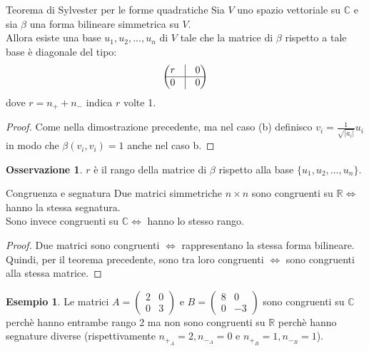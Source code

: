 \documentclass[a4paper]{article}
\theoremstyle{definition}
\newtheorem*{oss}{Osservazione}
\newtheorem*{es}{Esempio}
\begin{document}
	\begin{teo}{Teorema di Sylvester per le forme quadratiche}{}
		Sia $V$ uno spazio vettoriale su $\mathbb{C}$ e sia $\beta$ una forma bilineare simmetrica su $V$. \\
		Allora esiste una base $u_1, u_2, ..., u_n$ di $V$ tale che la matrice di $\beta$ rispetto a tale base è diagonale del tipo:
		\begin{align*}
			\begin{pmatrix}
				r & \vline & 0 \\
				\hline
				0 & \vline & 0
			\end{pmatrix}
		\end{align*}
		dove $r = n_+ + n_-$ indica $r$ volte 1.
	\end{teo}

	\begin{proof}
		Come nella dimostrazione precedente, ma nel caso (b) definisco $v_i = \frac{1}{\sqrt{|a_i|}}u_i$ in modo che $\beta(v_i, v_i) = 1$ anche nel caso b.
	\end{proof}

	\begin{oss}
		$r$ è il rango della matrice di $\beta$ rispetto alla base $\{u_1, u_2, ..., u_n\}$.
	\end{oss}

	\begin{cor}{Congruenza e segnatura}{}
		Due matrici simmetriche $n \times n$ sono congruenti su $\mathbb{R} \Leftrightarrow$ hanno la stessa segnatura. \\
		Sono invece congruenti su $\mathbb{C} \Leftrightarrow$ hanno lo stesso rango.
	\end{cor}

	\begin{proof}
		Due matrici sono congruenti $\Leftrightarrow$ rappresentano la stessa forma bilineare. \\
		Quindi, per il teorema precedente, sono tra loro congruenti $\Leftrightarrow$ sono congruenti alla stessa matrice.
	\end{proof}

	\begin{es}
		Le matrici $A = \begin{pmatrix}
			2 & 0 \\
			0 & 3
		\end{pmatrix}$ e $B = \begin{pmatrix}
			8 & 0 \\
			0 & -3
		\end{pmatrix}$ sono congruenti su $\mathbb{C}$ perchè hanno entrambe rango 2
		ma non sono congruenti su $\mathbb{R}$ perchè hanno segnature diverse (rispettivamente $n_{+_A} = 2, n_{-_A} = 0$ e $n_{+_B} = 1, n_{-_B} = 1$).
	\end{es}
\end{document}
